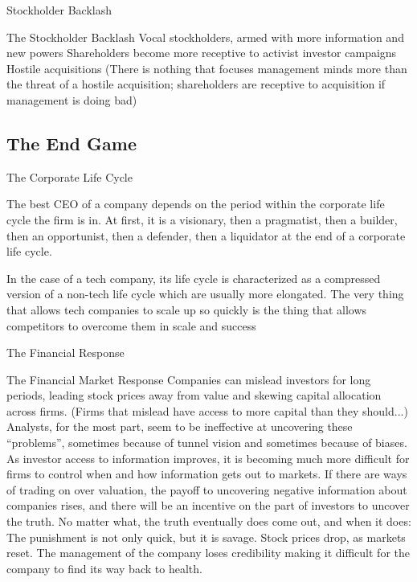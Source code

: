 \documentclass[10pt]{article}
\begin{document}
    \begin{core}{Stockholder Backlash}

      The Stockholder Backlash
      Vocal stockholders, armed with more information and new powers
      Shareholders become more receptive to activist investor campaigns
      Hostile acquisitions (There is nothing that focuses management minds more than the threat of a hostile acquisition; shareholders are receptive to acquisition if management is doing bad)

    \end{core}

  
  \subsection{The End Game}

    \begin{core}{The Corporate Life Cycle}

      The best CEO of a company depends on the period within the corporate life cycle the firm is in. At first, it is a visionary, then a pragmatist, then a builder, then an opportunist, then a defender, then a liquidator at the end of a corporate life cycle.

      In the case of a tech company, its life cycle is characterized as a compressed version of a non-tech life cycle which are usually more elongated.
      The very thing that allows tech companies to scale up so quickly is the thing that allows competitors to overcome them in scale and success

    \end{core}

    \begin{core}{The Financial Response}

      The Financial Market Response
      Companies can mislead investors for long periods, leading stock prices away from value and skewing capital allocation across firms. (Firms that mislead have access to more capital than they should...)
      Analysts, for the most part, seem to be ineffective at uncovering these “problems”, sometimes because of tunnel vision and sometimes because of biases.
      As investor access to information improves, it is becoming much more difficult for firms to control when and how information gets out to markets.
      If there are ways of trading on over valuation, the payoff to uncovering negative information about companies rises, and there will be an incentive on the part of investors to uncover the truth.
      No matter what, the truth eventually does come out, and when it does:
      The punishment is not only quick, but it is savage. Stock prices drop, as markets reset.
      The management of the company loses credibility making it difficult for the company to find its way back to health.

    \end{core}
\end{document}
